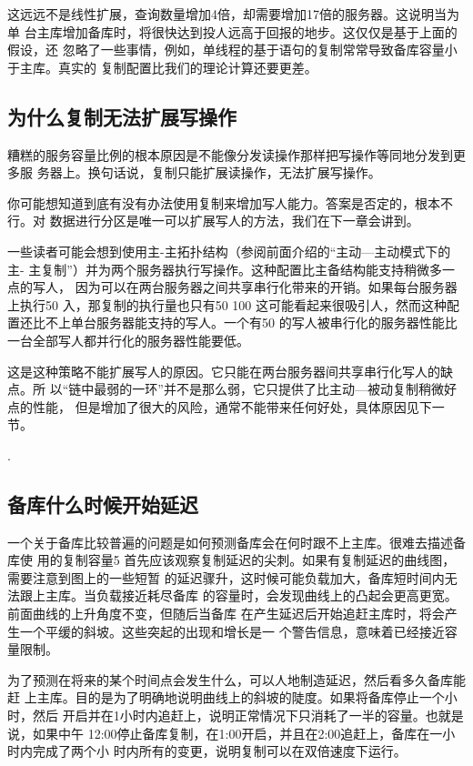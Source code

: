 这远远不是线性扩展，查询数量增加4倍，却需要增加17倍的服务器。这说明当为单
台主库增加备库时，将很快达到投人远高于回报的地步。这仅仅是基于上面的假设，还
忽略了一些事情，例如，单线程的基于语句的复制常常导致备库容量小于主库。真实的
复制配置比我们的理论计算还要更差。

\subsection{为什么复制无法扩展写操作}
糟糕的服务容量比例的根本原因是不能像分发读操作那样把写操作等同地分发到更多服
务器上。换句话说，复制只能扩展读操作，无法扩展写操作。

你可能想知道到底有没有办法使用复制来增加写人能力。答案是否定的，根本不行。对
数据进行分区是唯一可以扩展写人的方法，我们在下一章会讲到。

一些读者可能会想到使用主-主拓扑结构（参阅前面介绍的“主动—主动模式下的主-
主复制”）并为两个服务器执行写操作。这种配置比主备结构能支持稍微多一点的写人，
因为可以在两台服务器之间共享串行化带来的开销。如果每台服务器上执行50%
入，那复制的执行量也只有50%
100%
这可能看起来很吸引人，然而这种配置还比不上单台服务器能支持的写人。一个有50%
的写人被串行化的服务器性能比一台全部写人都并行化的服务器性能要低。

这是这种策略不能扩展写人的原因。它只能在两台服务器间共享串行化写人的缺点。所
以“链中最弱的一环”并不是那么弱，它只提供了比主动—被动复制稍微好点的性能，
但是增加了很大的风险，通常不能带来任何好处，具体原因见下一节。

.

\subsection{备库什么时候开始延迟}
一个关于备库比较普遍的问题是如何预测备库会在何时跟不上主库。很难去描述备库使
用的复制容量5%
首先应该观察复制延迟的尖刺。如果有复制延迟的曲线图，需要注意到图上的一些短暂
的延迟骤升，这时候可能负载加大，备库短时间内无法跟上主库。当负载接近耗尽备库
的容量时，会发现曲线上的凸起会更高更宽。前面曲线的上升角度不变，但随后当备库
在产生延迟后开始追赶主库时，将会产生一个平缓的斜坡。这些突起的出现和增长是一
个警告信息，意味着已经接近容量限制。

为了预测在将来的某个时间点会发生什么，可以人地制造延迟，然后看多久备库能赶
上主库。目的是为了明确地说明曲线上的斜坡的陡度。如果将备库停止一个小时，然后
开启并在1小时内追赶上，说明正常情况下只消耗了一半的容量。也就是说，如果中午
12:00停止备库复制，在1:00开启，并且在2:00追赶上，备库在一小时内完成了两个小
时内所有的变更，说明复制可以在双倍速度下运行。

